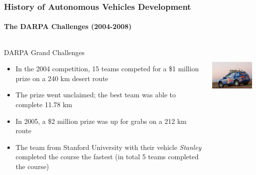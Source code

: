 \begin{frame}
\frametitle{History of Autonomous Vehicles Development}
\framesubtitle{The DARPA Challenges (2004-2008)}
\begin{columns}[T]
    \begin{column}{.65\textwidth}
    DARPA Grand Challenges\footnotemark[1]
    \begin{itemize}
        \item In the 2004 competition, 15 teams competed for a \$1 million prize
            on a 240 km desert route
        \item The prize went unclaimed; the best team was able to complete
            11.78 km
        \item In 2005, a \$2 million prize was up for grabs on a 212 km route
        \item The team from Stanford University with their vehicle
            \emph{Stanley} completed the course the fastest (in total 5 teams
            completed the course)
    \end{itemize}
    \end{column}
    \begin{column}{.35\textwidth}
    \centering
    \includegraphics[height=3cm]{images/darpa_stanley.jpg} \\
    \tiny{\cite{DARPAStanley}}
    \end{column}
\end{columns}
\end{frame}
    
